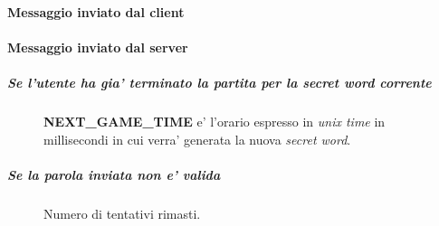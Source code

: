 \paragraph{Messaggio inviato dal client}

\begin{lrbox}{\asciiart}
	\begin{varwidth}{\maxdimen}
		\noindent
	\end{varwidth}
\end{lrbox}%

\begin{center}
	\begin{figure}[h]
		\makebox[\textwidth]{\showasciiart{50ex}}
	\end{figure}
\end{center}

\paragraph{Messaggio inviato dal server}

\subparagraph{Se l'utente ha gia' terminato la partita per la secret word corrente}

\begin{lrbox}{\asciiart}
	\begin{varwidth}{\maxdimen}
		\noindent
	\end{varwidth}
\end{lrbox}%

\begin{center}
	\begin{figure}[h]
		\makebox[\textwidth]{\showasciiart{45ex}}
		\centering \textbf{NEXT\_GAME\_TIME} e' l'orario espresso in \emph{unix time} in millisecondi in cui verra' generata la nuova \emph{secret word}.
	\end{figure}
\end{center}


\subparagraph{Se la parola inviata non e' valida}

\begin{lrbox}{\asciiart}
	\begin{varwidth}{\maxdimen}
		\noindent
	\end{varwidth}
\end{lrbox}%

\begin{center}
	\begin{figure}[h]
		\makebox[\textwidth]{\showasciiart{45ex}}
		\centering Numero di tentativi rimasti.
	\end{figure}
\end{center}

